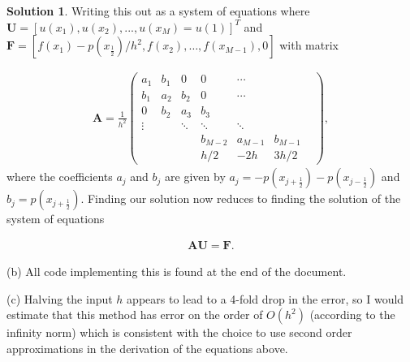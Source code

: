 \documentclass[12pt]{article}
\renewcommand{\vec}[1]{\mathbf{#1}}
\theoremstyle{definition}
\newtheorem{sol}{Solution}
\theoremstyle{remark}
\begin{document}
\begin{sol}
    Writing this out as a system of equations where $\vec{U} = [ u(x_{1}), u(x_{2}), ..., u(x_{M}) = u(1) ]^{T}$ and $\vec{F} = [f(x_{1}) - p(x_{\frac{1}{2}}) / h^{2}, f(x_{2}), \ldots, f(x_{M-1}), 0 ]$ with matrix

    \begin{align*}
        \vec{A} = \frac{1}{h^{2}} 
        \begin{pmatrix}
            a_{1} & b_{1} & 0 &   0 & \cdots \\ 
            b_{1} & a_{2} & b_{2} & 0 & \cdots\\
            0     & b_{2} & a_{3} &  b_{3} & &   & \\
            \vdots  & & \ddots & \ddots & \ddots\\
                    &&& b_{M-2} & a_{M-1} & b_{M-1}    \\
                    &&& h/ 2 & -2h & 3h / 2    
        \end{pmatrix},
    \end{align*}
    where the coefficients $a_{j}$ and $b_{j}$ are given by $a_{j} = - p(x_{j + \frac{1}{2}}) - p(x_{j-\frac{1}{2}})$ and $b_{j} = p(x_{j + \frac{1}{2}})$. Finding our solution now reduces to finding the solution of the system of equations

    \begin{align*}
    \vec{A} \vec{U} = \vec{F}.
    \end{align*}

    (b) All code implementing this is found at the end of the document.

    (c) Halving the input $h$ appears to lead to a 4-fold drop in the error, so I would estimate that this method has error on the order of $O(h^2)$ (according to the infinity norm) which is consistent with the choice to use second order approximations in the derivation of the equations above.
\end{sol}
\end{document}
